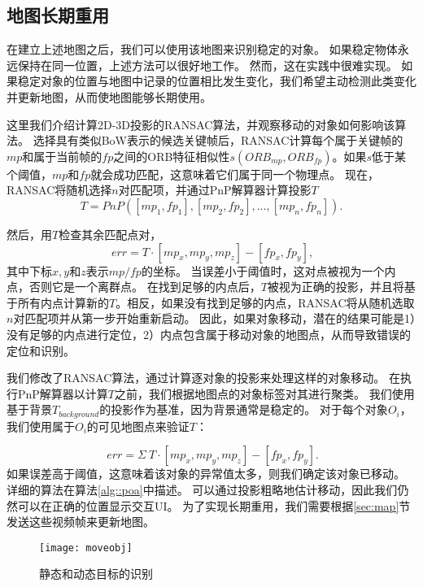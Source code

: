 \subsection{地图长期重用}
在建立上述地图之后，我们可以使用该地图来识别稳定的对象。
如果稳定物体永远保持在同一位置，上述方法可以很好地工作。
然而，这在实践中很难实现。
如果稳定对象的位置与地图中记录的位置相比发生变化，我们希望主动检测此类变化并更新地图，从而使地图能够长期使用。

这里我们介绍计算2D-3D投影的RANSAC\cite{derpanis2010overview}算法，并观察移动的对象如何影响该算法。
选择具有类似BoW表示的候选关键帧后，RANSAC计算每个属于关键帧的$mp$和属于当前帧的$fp$之间的ORB特征相似性$s(ORB_{mp}, ORB_{fp})$。如果$s$低于某个阈值，$mp$和$fp$就会成功匹配，这意味着它们属于同一个物理点。
现在，RANSAC将随机选择$n$对匹配项，并通过PnP解算器计算投影$T$
\begin{equation}\label{equ:pnp}
    T = PnP([mp_1, fp_1],[mp_2, fp_2], ..., [mp_n, fp_n]).
\end{equation} 

然后，用$T$检查其余匹配点对，
\begin{equation}\label{equ:check}
    \
    err = T \cdot [mp_x, mp_y, mp_z] - [fp_x, fp_y],
\end{equation} 
其中下标$x,y$和$z$表示$mp/fp$的坐标。
当误差小于阈值时，这对点被视为一个内点，否则它是一个离群点。
在找到足够的内点后，$T$被视为正确的投影，并且将基于所有内点计算新的$T$。相反，如果没有找到足够的内点，RANSAC将从随机选取$n$对匹配项并从第一步开始重新启动。
因此，如果对象移动，潜在的结果可能是1）没有足够的内点进行定位，2）内点包含属于移动对象的地图点，从而导致错误的定位和识别。

我们修改了RANSAC算法，通过计算逐对象的投影来处理这样的对象移动。
在执行PnP解算器以计算$T$之前，我们根据地图点的对象标签对其进行聚类。
我们使用基于背景$T_{background}$的投影作为基准，因为背景通常是稳定的。
对于每个对象$O_i$，我们使用属于$O_i$的可见地图点来验证$T$：

\begin{equation}\label{equ:gdt}
\
err = \Sigma \ T \cdot [mp_x, mp_y, mp_z] - [fp_x, fp_y].
\end{equation}
如果误差高于阈值，这意味着该对象的异常值太多，则我们确定该对象已移动。
详细的算法在算法\ref{alg::poa}中描述。
可以通过投影粗略地估计移动，因此我们仍然可以在正确的位置显示交互UI。
为了实现长期重用，我们需要根据\ref{sec:map}节发送这些视频帧来更新地图。

\begin{figure}[htb]
	\centering
	\texttt{[image: moveobj]}
	\caption{静态和动态目标的识别}
	\label{fig:move}
\end{figure}

